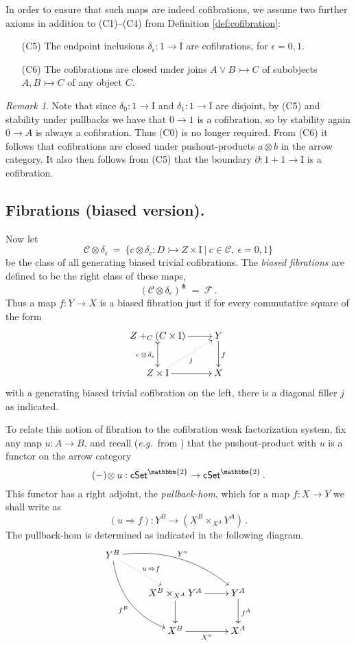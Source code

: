 \documentclass[11pt,reqno]{amsart}
\newcommand{\eg}{\emph{e.g.}}
\newcommand{\cSet}{\ensuremath{\mathsf{cSet}}}
\newcommand{\mono}{\ensuremath{\rightarrowtail}}
\newcommand{\ra}{\ensuremath{\rightarrow}}
\renewcommand{\to}{\ensuremath{\rightarrow}}
\newcommand{\too}{\ensuremath{\longrightarrow}}
\newcommand{\I}{\ensuremath{\mathrm{I}}}
\newcommand{\del}{\ensuremath{\partial}}
\theoremstyle{remark}
\newtheorem{remark}[theorem]{Remark}
\theoremstyle{definition}
\begin{document}
In order to ensure that such maps are indeed cofibrations, we assume two further axioms in addition to (C1)--(C4) from Definition \ref{def:cofibration}:
\begin{enumerate}\label{cofibration_axioms}
\item[(C5)] The endpoint inclusions $\delta_\epsilon : 1 \ra \I$ are cofibrations, for $\epsilon = 0,1$.
\item[(C6)] The cofibrations are closed under joins $A\vee B \mono C$ of subobjects $A, B \mono C$ of any object $C$.
\end{enumerate}
%
\begin{remark}\label{rem:somecofibs}
Note that since $\delta_0: 1\to\I$ and $\delta_1:1\to\I$ are disjoint, by (C5) and stability under pullbacks we have that $0 \ra 1$ is a cofibration, so by stability again $0\ra A$ is always a cofibration.  Thus (C0) is no longer required.  From (C6) it follows that cofibrations are closed under pushout-products ${a}\otimes{b}$ in the arrow category.  It also then follows from (C5) that the boundary $\del : 1+1 \to \I$ is a cofibration.
\end{remark}

\subsection*{Fibrations (biased version).}
Now let 
\[
\mathcal{C}\otimes \delta_\epsilon\ =\ \{ c \otimes \delta_\epsilon : D \mono Z \times \I\ |\ c \in\mathcal{C},\ \epsilon = 0,1 \}
\]
be the class of all generating biased trivial cofibrations.
The \emph{biased fibrations} are defined to be the right class of these maps,
\[
(\mathcal{C}\otimes \delta_\epsilon)^\pitchfork\ =\ \mathcal{F}\,.
\]
Thus a map $f : Y\ra X$ is a biased fibration just if for every commutative square of the form
\begin{equation}\label{diagram:biasedfillers}
\xymatrix{
Z +_C (C\times\I) \ar@{>->}[d]_{c\, \otimes\, \delta_\epsilon} \ar[r] & Y \ar[d]^f \\
Z\times \I \ar@{.>}[ru]_{j} \ar[r] & X
}
\end{equation}
with a generating biased trivial cofibration on the left, there is a diagonal filler $j$ as indicated. 

To relate this notion of fibration to the cofibration weak factorization system, fix any map $u : A \ra B$, and recall (\eg\ from \cite{JT:notes,Riehl}) that the pushout-product with $u$ is a functor on the arrow category 
\[
(-)\!\otimes u : \cSet^\mathbbm{2} \ra\cSet^\mathbbm{2}\,.
\]
This functor has a right adjoint, the \emph{pullback-hom}, which for a map $f : X\ra Y$ we shall write as
\[
(u \Rightarrow\! f) : Y^B \too (X^B \times_{X^A} Y^A) \,.
\]
The pullback-hom is determined as indicated in the following diagram.
\begin{equation}\label{diagram:pullbackhom}
\xymatrix{
Y^B \ar@/_4ex/[rdd]_{f^B} \ar@{.>}[rd]^{u\, \Rightarrow f} \ar@/^4ex/ [rrd]^{Y^u} && \\
& X^B \times_{X^A} Y^A \ar[d] \ar[r] & Y^A \ar[d]^{f^A} \\
& X^B \ar[r]_{X^u} &  X^A 
}
\end{equation}
\end{document}
